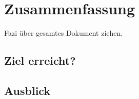 \chapter{Zusammenfassung}

Fazi über gesamtes Dokument ziehen.

\section{Ziel erreicht?}

\section{Ausblick}

